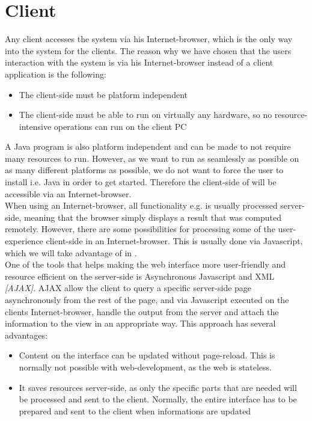 
\section{Client}\label{sec:design_client}
Any client accesses the system via his Internet-browser, which is the only way into the system for the clients. 
The reason why we have chosen that the users interaction with the system is via his Internet-browser instead of a client application is the following:

\begin{itemize}
	\item The client-side must be platform independent
	\item The client-side must be able to run on virtually any hardware, so no resource-intensive operations can run on the client PC
\end{itemize}

A Java program is also platform independent and can be made to not require many resources to run. 
However, as we want \projectname{} to run as seamlessly as possible on as many different platforms as possible, we do not want to force the user to install i.e. Java in order to get started.
Therefore the client-side of \projectname{} will be accessible via an Internet-browser. \\

When using an Internet-browser, all functionality e.g. is usually processed server-side, meaning that the browser simply displays a result that was computed remotely. 
However, there are some possibilities for processing some of the user-experience client-side in an Internet-browser. 
This is usually done via Javascript, which we will take advantage of in \projectname{}. \\

One of the tools that helps making the web interface more user-friendly and resource efficient on the server-side is Asynchronous Javascript and XML \emph{[AJAX]}. 
AJAX allow the client to query a specific server-side page asynchronously from the rest of the page, and via Javascript executed on the clients Internet-browser, handle the output from the server and attach the information to the view in an appropriate way. 
This approach has several advantages:

\begin{itemize}
	\item Content on the interface can be updated without page-reload. This is normally not possible with web-development, as the web is stateless.
	\item It saves resources server-side, as only the specific parts that are needed will be processed and sent to the client. Normally, the entire interface has to be prepared and sent to the client when informations are updated
\end{itemize}

